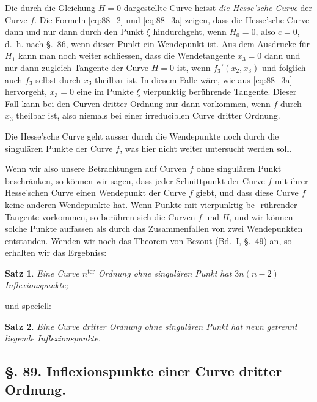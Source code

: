 \documentclass[12pt,a4paper]{article}
\theoremstyle{plain}
\newtheorem{satz}{Satz}[section]
\theoremstyle{definition}
\theoremstyle{remark}
\begin{document}
Die durch die Gleichung $H = 0$ dargestellte Curve heisst
\emph{die Hesse'sche Curve} der Curve $f$. Die Formeln \eqref{eq:88_2} und \eqref{eq:88_3a}
zeigen, dass die Hesse'sche Curve dann und nur dann durch den
Punkt $\xi$ hindurchgeht, wenn $H_0 = 0$, also $c = 0$, d.~h. nach \S.~86,
wenn dieser Punkt ein Wendepunkt ist. Aus dem Ausdrucke
für $H_1$ kann man noch weiter schliessen, dass die Wendetangente
$x_3 = 0$ dann und nur dann zugleich Tangente der Curve $H=0$
ist, wenn $f_3'(x_2, x_3)$ und folglich auch $f_3$ selbst durch $x_3$ theilbar
ist. In diesem Falle wäre, wie aus \eqref{eq:88_3a} hervorgeht, $x_3 = 0$ eine
im Punkte $\xi$ vierpunktig berührende Tangente. Dieser
Fall kann bei den Curven dritter Ordnung nur dann vorkommen,
wenn $f$ durch $x_3$ theilbar ist, also niemals bei einer irreduciblen
Curve dritter Ordnung.

Die Hesse'sche Curve geht ausser durch die Wendepunkte
noch durch die singulären Punkte der Curve $f$, was hier nicht
weiter untersucht werden soll.

Wenn wir also unsere Betrachtungen auf Curven $f$ ohne
singulären Punkt beschränken, so können wir sagen, dass jeder
Schnittpunkt der Curve $f$ mit ihrer Hesse'schen Curve einen
Wendepunkt der Curve $f$ giebt, und dass diese Curve $f$ keine
anderen Wendepunkte hat. Wenn Punkte mit vierpunktig be-
rührender Tangente vorkommen, so berühren sich die Curven $f$
und $H$, und wir können solche Punkte auffassen als durch das
Zusammenfallen von zwei Wendepunkten entstanden. Wenden
wir noch das Theorem von Bezout (Bd.~I, \S.~49) an, so erhalten
wir das Ergebniss:

\begin{satz}
Eine Curve $n^{\text{ter}}$ Ordnung ohne singulären Punkt
hat $3n(n-2)$ Inflexionspunkte;
\end{satz}

und speciell:

\begin{satz}
Eine Curve dritter Ordnung ohne singulären Punkt
hat neun getrennt liegende Inflexionspunkte.
\end{satz}

\subsection*{§. 89. Inflexionspunkte einer Curve dritter Ordnung.}
\end{document}

